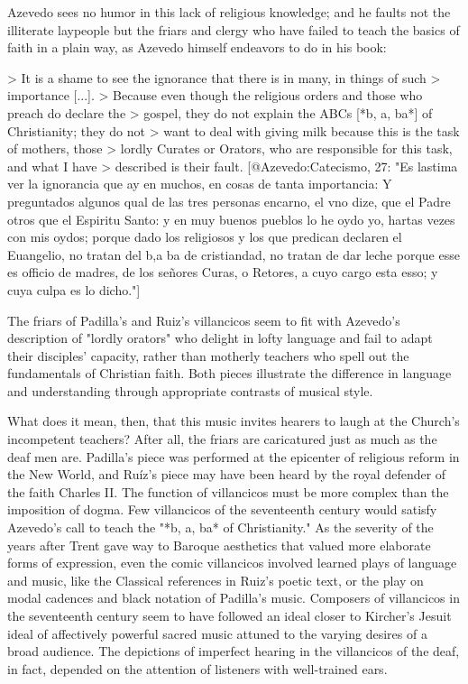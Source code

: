 Azevedo sees no humor in this lack of religious knowledge; and he faults not the
illiterate laypeople but the friars and clergy who have failed to
teach the basics of faith in a plain way, as Azevedo himself endeavors to do in
his book:

> It is a shame to see the ignorance that there is in many, in things of such
> importance [...]. 
> Because even though the religious orders and those who preach do declare the
> gospel, they do not explain the ABCs [*b, a, ba*] of Christianity; they do not
> want to deal with giving milk because this is the task of mothers, those
> lordly Curates or Orators, who are responsible for this task, and what I have
> described is their fault. 
[@Azevedo:Catecismo, 27: 
"Es lastima ver la ignorancia que ay en muchos, en cosas de tanta importancia: Y
preguntados algunos qual de las tres personas encarno, el vno dize, que el Padre
otros que el Espiritu Santo: y en muy buenos pueblos lo he oydo yo, hartas vezes
con mis oydos; porque dado los religiosos y los que predican declaren el
Euangelio, no tratan del b,a ba de cristiandad, no tratan de dar leche porque
esse es officio de madres, de los señores Curas, o Retores, a cuyo cargo esta
esso; y cuya culpa es lo dicho."]

The friars of Padilla's and Ruiz's villancicos seem to fit with Azevedo's
description of "lordly orators" who delight in lofty language and fail to adapt
their disciples' capacity, rather than motherly teachers who spell out the
fundamentals of Christian faith. 
Both pieces illustrate the difference in language and understanding through
appropriate contrasts of musical style.

What does it mean, then, that this music invites hearers to laugh at the
Church's incompetent teachers?
After all, the friars are caricatured just as much as the deaf men are.
Padilla's piece was performed at the epicenter of religious reform in the New
World, and Ruíz's piece may have been heard by the royal defender of the faith
Charles II.  %
The function of villancicos must be more complex than the imposition of dogma.
Few villancicos of the seventeenth century would satisfy Azevedo's call to teach
the "*b, a, ba* of Christianity."
As the severity of the years after Trent gave way to Baroque aesthetics that
valued more elaborate forms of expression, even the comic villancicos involved
learned plays of language and music, like the Classical references in Ruiz's
poetic text, or the play on modal cadences and black notation of Padilla's
music. 
Composers of villancicos in the seventeenth century seem to have followed an
ideal closer to Kircher's Jesuit ideal of affectively powerful sacred music
attuned to the varying desires of a broad audience. 
The depictions of imperfect hearing in the villancicos of the deaf, in fact,
depended on the attention of listeners with well-trained ears.


